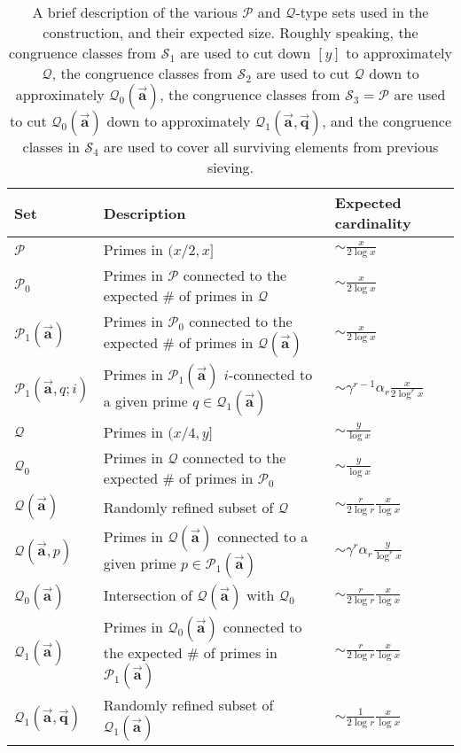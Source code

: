 \documentclass[11pt]{amsart}
\numberwithin{equation}{section}  %
\theoremstyle{remark}
\theoremstyle{plain}
\numberwithin{equation}{section}
\renewcommand{\(}{\left(}
\renewcommand{\)}{\right)}
\newcommand{\asym}{\sim}   %
\newcommand{\vect}[1]{{\ensuremath{\vec{#1}}}}
\newcommand{\PP}{\mathcal{P}}
\newcommand{\QQ}{\mathcal{Q}}
\newcommand{\cS}{\mathcal{S}}
\begin{document}
\begin{table}
\begin{tabular}{|l|l|l|}
\hline
Set & Description & Expected cardinality \\
\hline
$\PP$ & Primes in $(x/2,x]$ & $\asym \frac{x}{2\log x}$ \\
$\PP_0$ & Primes in $\PP$ connected to the expected \# of primes in $\QQ$ & $\asym \frac{x}{2\log x}$\\ 
$\PP_1(\vect{\mathbf{a}})$ & Primes in $\PP_0$ connected to the expected \# of primes in $\QQ(\vect{\mathbf{a}})$ & $\asym \frac{x}{2\log x}$\\
$\PP_1(\vect{\mathbf{a}},q;i)$ & Primes in $\PP_1(\vect{\mathbf{a}})$ $i$-connected to a given prime $q \in \QQ_1(\vect{\mathbf{a}})$ & $\asym \gamma^{r-1} \alpha_r \frac{x}{2\log^r x}$ \\
\hline
$\QQ$ & Primes in $(x/4,y]$ & $\asym \frac{y}{\log x}$ \\
$\QQ_0$ & Primes in $\QQ$ connected to the expected \# of primes in $\PP_0$ & $\asym \frac{y}{\log x}$ \\
$\QQ(\vect{\mathbf{a}})$ & Randomly refined subset of $\QQ$ & $\asym \frac{r}{2\log r} \frac{x}{\log x}$ \\
$\QQ(\vect{\mathbf{a}}, p)$ & Primes in $\QQ(\vect{\mathbf{a}})$ connected to a given prime $p \in \PP_1(\vect{\mathbf{a}})$ & $\asym \gamma^r\alpha_r\frac y{\log^r x}$ \\
$\QQ_0(\vect{\mathbf{a}})$ & Intersection of $\QQ(\vect{\mathbf{a}})$ with $\QQ_0$ & $\asym \frac{r}{2\log r} \frac{x}{\log x}$ \\
$\QQ_1(\vect{\mathbf{a}})$ & Primes in $\QQ_0(\vect{\mathbf{a}})$ connected to the expected \# of primes in $\PP_1(\vect{\mathbf{a}})$ & $\asym \frac{r}{2\log r} \frac{x}{\log x}$ \\
$\QQ_1(\vect{\mathbf{a}},\vect{\mathbf{q}})$ & Randomly refined subset of $\QQ_1(\vect{\mathbf{a}})$ & $\asym \frac{1}{2\log r} \frac{x}{\log x}$\\
\hline
\end{tabular}
\caption{A brief description of the various $\PP$ and $\QQ$-type sets used in the construction, and their expected size.  Roughly speaking, the congruence classes from $\cS_1$ are used to cut down $[y]$ to approximately $\QQ$, the congruence classes from $\cS_2$ are used to cut $\QQ$ down to approximately $\QQ_0(\vect{\mathbf{a}})$, the congruence classes from $\cS_3 = \PP$ are used to cut $\QQ_0(\vect{\mathbf{a}})$ down to approximately $\QQ_1(\vect{\mathbf{a}}, \vect{\mathbf{q}})$, and the congruence classes in $\cS_4$ are used to cover all surviving elements from previous sieving.}
\end{table}
\end{document}
